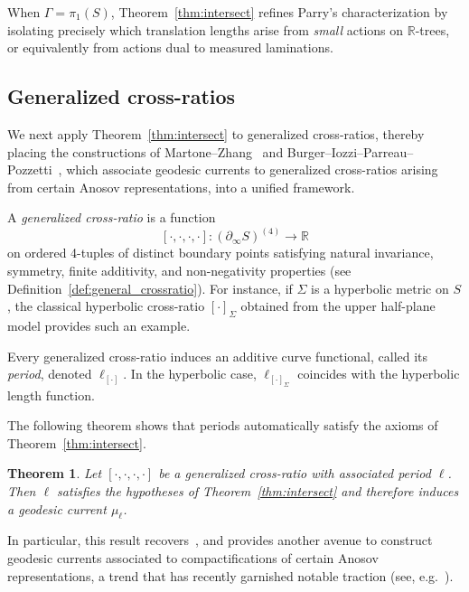 \documentclass[11pt]{amsart}
\numberwithin{equation}{section}
\numberwithin{figure}{section}
\newtheorem{mainthm}{Theorem}
\theoremstyle{definition}
\theoremstyle{plain}
\begin{document}
When $\Gamma=\pi_1(S)$, Theorem~\ref{thm:intersect} refines Parry’s
characterization by isolating precisely which translation lengths arise
from \emph{small} actions on $\mathbb{R}$-trees, or equivalently from
actions dual to measured laminations.

\subsection{Generalized cross-ratios}

We next apply Theorem~\ref{thm:intersect} to generalized cross-ratios, thereby placing the constructions of Martone--Zhang~\cite{MZ19:PositivelyRatioed} and Burger--Iozzi--Parreau--Pozzetti~\cite{BIPP24:PositiveCrossratios}, which associate geodesic currents to generalized cross-ratios arising from certain Anosov representations, into a unified framework.

A \emph{generalized cross-ratio} is a function
\[
[\cdot,\cdot,\cdot,\cdot]\colon (\partial_\infty S)^{(4)}\to\mathbb{R}
\]
on ordered 4-tuples of distinct boundary points satisfying natural
invariance, symmetry, finite additivity, and non-negativity properties
(see Definition~\ref{def:general_crossratio}). 
For instance, if $\Sigma$ is a hyperbolic metric on $S$, the classical
hyperbolic cross-ratio $[\cdot]_\Sigma$ obtained from the upper
half-plane model provides such an example.

Every generalized cross-ratio induces an additive curve functional,
called its \emph{period}, denoted $\ell_{[\cdot]}$.
In the hyperbolic case, $\ell_{[\cdot]_\Sigma}$ coincides with the
hyperbolic length function.

The following theorem shows that periods automatically satisfy the
axioms of Theorem~\ref{thm:intersect}.

\begin{mainthm}
Let $[\cdot,\cdot,\cdot,\cdot]$ be a generalized cross-ratio with
associated period $\ell$. Then $\ell$ satisfies the hypotheses of
Theorem~\ref{thm:intersect} and therefore induces a geodesic current
$\mu_\ell$.
\label{mainthm:crossratio}
\end{mainthm}

In particular, this result recovers~\cite[Proposition~4.8]{BIPP24:PositiveCrossratios}, and provides another avenue to construct geodesic currents associated to compactifications of certain Anosov representations, a trend that has recently garnished notable traction (see, e.g.~\cite{OT23:SO23,OT24:Blaschke,Reid25:Boundary}).
\end{document}
